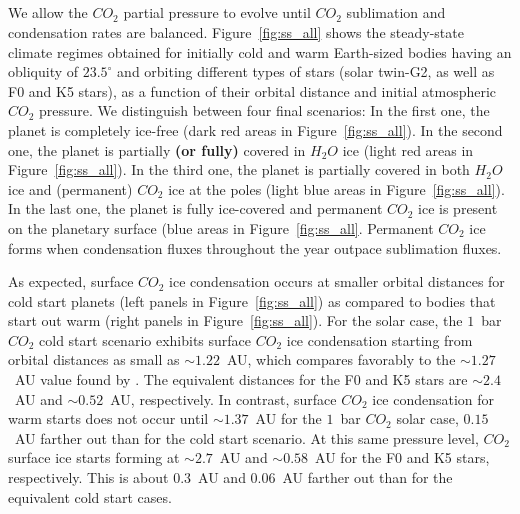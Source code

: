 \documentclass[fleqn,usenatbib]{mnras}
\providecommand{\DIFadd}[1]{{\bf #1}} %
\providecommand{\DIFdel}[1]{} %
\providecommand{\DIFaddbegin}{} %
\providecommand{\DIFaddend}{} %
\providecommand{\DIFdelbegin}{} %
\providecommand{\DIFdelend}{} %
\newcommand{\DIFscaledelfig}{0.5}
\newlength{\DIFdelgraphicswidth} %
\newlength{\DIFdelgraphicsheight} %
\newcommand{\DIFaddincludegraphics}[2][]{{\color{blue}\fbox{\DIFOincludegraphics[#1]{#2}}}} %
\newcommand{\DIFdelincludegraphics}[2][]{%
\sbox{\DIFdelgraphicsbox}{\DIFOincludegraphics[#1]{#2}}%
\settoboxwidth{\DIFdelgraphicswidth}{\DIFdelgraphicsbox} %
\settoboxtotalheight{\DIFdelgraphicsheight}{\DIFdelgraphicsbox} %
\scalebox{\DIFscaledelfig}{%
\parbox[b]{\DIFdelgraphicswidth}{\usebox{\DIFdelgraphicsbox}\\[-\baselineskip] \rule{\DIFdelgraphicswidth}{0em}}\llap{\resizebox{\DIFdelgraphicswidth}{\DIFdelgraphicsheight}{%
\setlength{\unitlength}{\DIFdelgraphicswidth}%
\begin{picture}(1,1)%
\thicklines\linethickness{2pt} %
{\color[rgb]{1,0,0}\put(0,0){\framebox(1,1){}}}%
{\color[rgb]{1,0,0}\put(0,0){\line( 1,1){1}}}%
{\color[rgb]{1,0,0}\put(0,1){\line(1,-1){1}}}%
\end{picture}%
}\hspace*{3pt}}} %
} %
\DeclareRobustCommand{\DIFaddbegin}{\DIFOaddbegin \let\includegraphics\DIFaddincludegraphics} %
\DeclareRobustCommand{\DIFaddend}{\DIFOaddend \let\includegraphics\DIFOincludegraphics} %
\DeclareRobustCommand{\DIFdelbegin}{\DIFOdelbegin \let\includegraphics\DIFdelincludegraphics} %
\DeclareRobustCommand{\DIFdelend}{\DIFOaddend \let\includegraphics\DIFOincludegraphics} %
\begin{document}
\subsection{\DIFdel{Steady-state climate regimes}}
\addtocounter{subsection}{-1}%

\DIFdelend We allow the $CO_{\mathrm{2}}$ partial pressure to evolve until $CO_{\mathrm{2}}$ sublimation and condensation rates are balanced. Figure~\ref{fig:ss_all} shows the steady-state climate regimes obtained for initially cold and warm Earth-sized bodies having an obliquity of $23.5^{\circ}$ and orbiting different types of stars (solar twin-G2, as well as F0 and K5 stars), as a function of their orbital distance and initial atmospheric $CO_{\mathrm{2}}$ pressure. We distinguish between four final scenarios: In the first one, the planet is completely ice-free (dark red areas in Figure~\ref{fig:ss_all}). In the second one, the planet is partially \DIFaddbegin \DIFadd{(or fully) }\DIFaddend covered in $H_{\mathrm{2}}O$ ice (light red areas in Figure~\ref{fig:ss_all}). In the third one, the planet is partially covered in both $H_{\mathrm{2}}O$ ice and (permanent) $CO_{\mathrm{2}}$ ice at the poles (light blue areas in Figure~\ref{fig:ss_all}). In the last one, the planet is fully ice-covered and permanent $CO_{\mathrm{2}}$ ice is present on the planetary surface (blue areas in Figure~\ref{fig:ss_all}. Permanent $CO_{\mathrm{2}}$ ice forms when condensation fluxes throughout the year outpace sublimation fluxes. 

As expected, surface $CO_{\mathrm{2}}$ ice condensation occurs at smaller orbital distances for cold start planets (left panels in Figure~\ref{fig:ss_all}) as compared to bodies that start out warm (right panels in Figure~\ref{fig:ss_all}).
For the solar case, the $1$~bar $CO_{\mathrm{2}}$ cold start scenario exhibits surface $CO_{\mathrm{2}}$ ice condensation starting from orbital distances as small as \DIFdelbegin \DIFdel{$\sim1.2$}\DIFdelend \DIFaddbegin \DIFadd{$\sim1.22$}\DIFaddend ~AU, which compares favorably to the $\sim 1.27$~AU value found by \citet{Turbet2017}. The equivalent distances for the F0 and K5 stars are $\sim2.4$~AU and $\sim0.52$~AU, respectively.
In contrast, surface $CO_{\mathrm{2}}$ ice condensation for warm starts does not occur until \DIFdelbegin \DIFdel{$\sim1.38$}\DIFdelend \DIFaddbegin \DIFadd{$\sim1.37$}\DIFaddend ~AU for the $1$~bar $CO_{\mathrm{2}}$ solar case, \DIFdelbegin \DIFdel{almost  $0.2$}\DIFdelend \DIFaddbegin \DIFadd{$0.15$}\DIFaddend ~AU farther out than for the cold start scenario. At this same pressure level, $CO_{\mathrm{2}}$ surface ice starts forming at $\sim2.7$~AU and $\sim0.58$~AU for the F0 and K5 stars, respectively. This is about $0.3$~AU and $0.06$~AU farther out than for the equivalent cold start cases.
\DIFdelbegin \DIFdel{The distances beyond which surface $CO_{\mathrm{2}}$ ice condensation starts forming are pressure-dependent, as a result of the greenhouse effect of $CO_{\mathrm{2}}$. At higher pressures, surface $CO_{\mathrm{2}}$ ice condensation in both warm and cold start cases occurs farther away from the host star, whereas the opposite takes place at lower pressures.
}%
\end{document}
